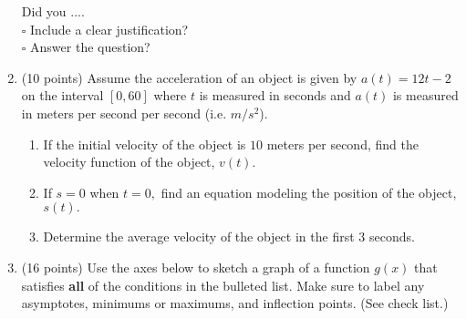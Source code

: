 \documentclass[12pt]{article}
\renewcommand{\emph}[1]{\textsf{\textbf{#1}}}
\begin{document}
\begin{enumerate}
\vfill
Did you ....\\
$\square$ Include a clear justification?\\
$\square$ Answer the question?\\
\newpage
\item (10 points) Assume the acceleration of an object is given by $a(t)=12t-2$ on the interval $[0,60]$ where $t$ is measured in seconds  and $a(t)$ is measured in meters per second per second (i.e. $m/s^2$).\\
\begin{enumerate}
\item If the initial velocity of the object is $10$ meters per second, find the velocity function of the object, $v(t).$
\vfill
\item If $s=0$ when $t=0,$ find an equation modeling the position of the object, $s(t).$
\vfill
\item Determine the average velocity of the object in the first 3 seconds.
\vfill
\end{enumerate}

\newpage
\item (16 points) Use the axes below to sketch a graph of a function $g(x)$ that satisfies \emph{all} of the conditions in the bulleted list. Make sure to label any asymptotes, minimums or maximums, and inflection points. (See check list.)


\end{enumerate}
\end{document}
